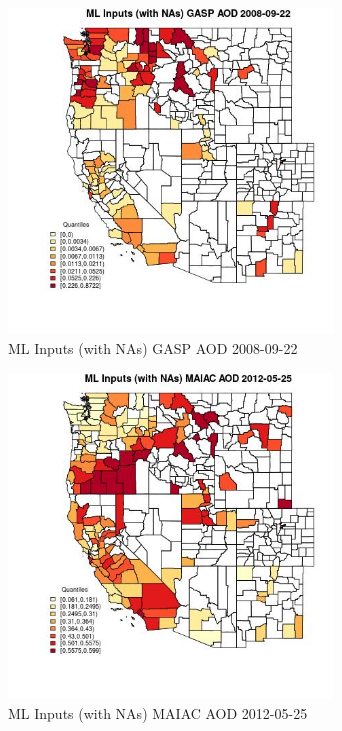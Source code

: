 \begin{figure} 
\centering  
\includegraphics[width=0.77\textwidth]{Code_Outputs/Report_ML_input_PM25_Step4_part_e_de_duplicated_aves_compiled_2019-05-18wNAs_CountyGASP_AODMean2008-09-22_2008-09-22.jpg} 
\caption{\label{fig:Report_ML_input_PM25_Step4_part_e_de_duplicated_aves_compiled_2019-05-18wNAsCountyGASP_AODMean2008-09-22_2008-09-22}ML Inputs (with NAs) GASP AOD 2008-09-22} 
\end{figure} 
 

\begin{figure} 
\centering  
\includegraphics[width=0.77\textwidth]{Code_Outputs/Report_ML_input_PM25_Step4_part_e_de_duplicated_aves_compiled_2019-05-18wNAs_CountyMAIAC_AODMean2012-05-25_2012-05-25.jpg} 
\caption{\label{fig:Report_ML_input_PM25_Step4_part_e_de_duplicated_aves_compiled_2019-05-18wNAsCountyMAIAC_AODMean2012-05-25_2012-05-25}ML Inputs (with NAs) MAIAC AOD 2012-05-25} 
\end{figure} 
 

